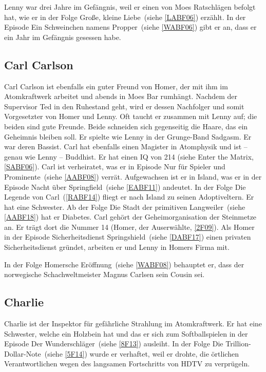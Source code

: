 Lenny war drei Jahre im Gefängnis, weil er einen von Moes Ratschlägen befolgt hat, wie er in der Folge \glqq Große, kleine Liebe\grqq\ (siehe \ref{LABF06}) erzählt. In der Episode \glqq Ein Schweinchen namens Propper\grqq\ (siehe \ref{WABF06}) gibt er an, dass er ein Jahr im Gefängnis gesessen habe.


\subsection{Carl Carlson}\label{CarlCarlson}
Carl Carlson ist ebenfalls ein guter Freund von Homer, der mit ihm im Atomkraftwerk arbeitet und abends in Moes Bar rumhängt. Nachdem der Supervisor Ted in den Ruhestand geht, wird er dessen Nachfolger und somit Vorgesetzter von Homer und Lenny. Oft taucht er zusammen mit Lenny auf; die beiden sind gute Freunde. Beide schneiden sich gegenseitig die Haare, das ein Geheimnis bleiben soll. Er spielte wie Lenny in der Grunge-Band \glqq Sadgasm\grqq . Er war deren Bassist. Carl hat ebenfalls einen Magister in Atomphysik und ist -- genau wie Lenny -- Buddhist. Er hat einen IQ von 214 (siehe \glqq Enter the Matrix\grqq , \ref{SABF06}). Carl ist verheiratet, was er in Episode \glqq Nur für Spieler und Prominente\grqq\ (siehe \ref{AABF08}) verrät. Aufgewachsen ist er in Island, was er in der Episode \glqq Nacht über Springfield\grqq\ (siehe \ref{EABF11}) andeutet. In der Folge \glqq Die Legende von Carl\grqq\ (\ref{RABF14}) fliegt er nach Island zu seinen Adoptiveltern. Er hat eine Schwester. Ab der Folge \glqq Die Stadt der primitiven Langweiler\grqq\ (siehe \ref{AABF18}) hat er Diabetes. Carl gehört der Geheimorganisation der Steinmetze an. Er trägt dort die Nummer 14 (\glqq Homer, der Auserwählte\grqq, \ref{2F09}). Als Homer in der Episode \glqq Sicherheitsdienst Springshield\grqq\ (siehe \ref{DABF17}) einen privaten Sicherheitsdienst gründet, arbeiten er und Lenny in Homers Firma mit.

In der Folge \glqq Homersche Eröffnung\grqq\ (siehe \ref{WABF08}) behauptet er, dass der norwegische Schachweltmeister Magnus Carlsen sein Cousin sei.

\subsection{Charlie}
Charlie ist der Inspektor für gefährliche Strahlung im Atomkraftwerk. Er hat eine Schwester, welche ein Holzbein hat und das er sich zum Softballspielen in der Episode \glqq Der Wunderschläger\grqq\ (siehe \ref{8F13}) ausleiht.
In der Folge \glqq Die Trillion-Dollar-Note\grqq\ (siehe \ref{5F14}) wurde er verhaftet, weil er drohte, die örtlichen Verantwortlichen wegen des langsamen Fortschritts von HDTV zu verprügeln.

